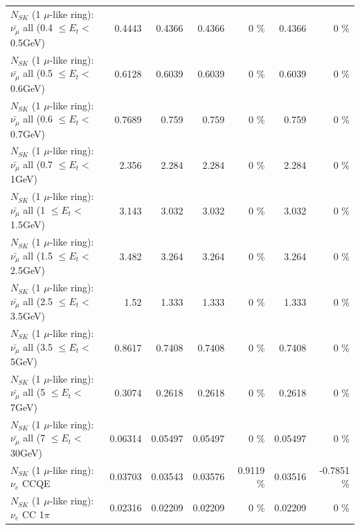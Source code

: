 \begin{table}
\begin{tabular}{| l | r | r | r  r | r  r |}
 $N_{SK}$ (1 $\mu$-like ring): $\bar{\nu_{\mu}}$ all (0.4 $\leq E_{t} <$ 0.5GeV) &          0.4443 &          0.4366 &          0.4366 &        0 \%  &          0.4366 &        0 \%  \\ 
 $N_{SK}$ (1 $\mu$-like ring): $\bar{\nu_{\mu}}$ all (0.5 $\leq E_{t} <$ 0.6GeV) &          0.6128 &          0.6039 &          0.6039 &        0 \%  &          0.6039 &        0 \%  \\ 
 $N_{SK}$ (1 $\mu$-like ring): $\bar{\nu_{\mu}}$ all (0.6 $\leq E_{t} <$ 0.7GeV) &          0.7689 &           0.759 &           0.759 &        0 \%  &           0.759 &        0 \%  \\ 
   $N_{SK}$ (1 $\mu$-like ring): $\bar{\nu_{\mu}}$ all (0.7 $\leq E_{t} <$ 1GeV) &           2.356 &           2.284 &           2.284 &        0 \%  &           2.284 &        0 \%  \\ 
   $N_{SK}$ (1 $\mu$-like ring): $\bar{\nu_{\mu}}$ all (1 $\leq E_{t} <$ 1.5GeV) &           3.143 &           3.032 &           3.032 &        0 \%  &           3.032 &        0 \%  \\ 
 $N_{SK}$ (1 $\mu$-like ring): $\bar{\nu_{\mu}}$ all (1.5 $\leq E_{t} <$ 2.5GeV) &           3.482 &           3.264 &           3.264 &        0 \%  &           3.264 &        0 \%  \\ 
 $N_{SK}$ (1 $\mu$-like ring): $\bar{\nu_{\mu}}$ all (2.5 $\leq E_{t} <$ 3.5GeV) &            1.52 &           1.333 &           1.333 &        0 \%  &           1.333 &        0 \%  \\ 
   $N_{SK}$ (1 $\mu$-like ring): $\bar{\nu_{\mu}}$ all (3.5 $\leq E_{t} <$ 5GeV) &          0.8617 &          0.7408 &          0.7408 &        0 \%  &          0.7408 &        0 \%  \\ 
     $N_{SK}$ (1 $\mu$-like ring): $\bar{\nu_{\mu}}$ all (5 $\leq E_{t} <$ 7GeV) &          0.3074 &          0.2618 &          0.2618 &        0 \%  &          0.2618 &        0 \%  \\ 
    $N_{SK}$ (1 $\mu$-like ring): $\bar{\nu_{\mu}}$ all (7 $\leq E_{t} <$ 30GeV) &         0.06314 &         0.05497 &         0.05497 &        0 \%  &         0.05497 &        0 \%  \\ 
\hline
\hline
\hline
                                      $N_{SK}$ (1 $\mu$-like ring): $\nu_e$ CCQE &         0.03703 &         0.03543 &         0.03576 &   0.9119 \%  &         0.03516 &  -0.7851 \%  \\ 
                                 $N_{SK}$ (1 $\mu$-like ring): $\nu_e$ CC 1$\pi$ &         0.02316 &         0.02209 &         0.02209 &        0 \%  &         0.02209 &        0 \%  \\ 

\end{tabular}
\end{table}
